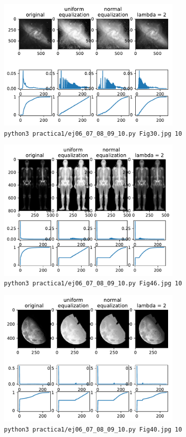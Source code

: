 \documentclass[11pt, spanish]{article}
\begin{document}
\begin{figure}[H]
\centering
  \includegraphics[width=0.8\textwidth]{informe-imgs/ej10-2.pdf}
  \caption{\texttt{python3 practica1/ej06\_07\_08\_09\_10.py Fig30.jpg 10}}
\end{figure}

\begin{figure}[H]
\centering
  \includegraphics[width=0.8\textwidth]{informe-imgs/ej10-3.pdf}
  \caption{\texttt{python3 practica1/ej06\_07\_08\_09\_10.py Fig46.jpg 10}}
\end{figure}

\begin{figure}[H]
\centering
  \includegraphics[width=0.8\textwidth]{informe-imgs/ej10-4.pdf}
  \caption{\texttt{python3 practica1/ej06\_07\_08\_09\_10.py Fig40.jpg 10}}
\end{figure}
\end{document}

